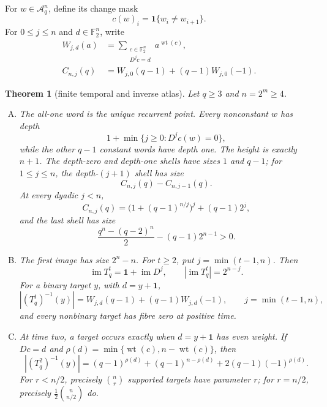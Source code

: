 \documentclass[a4paper,10pt]{amsart}
\newtheorem{theorem}{Theorem}
\theoremstyle{remark}
\newcommand{\F}{\mathbb F}
\newcommand{\one}{\boldsymbol 1}
\newcommand{\wt}{\operatorname{wt}}
\newcommand{\im}{\operatorname{im}}
\begin{document}
For $w\in\mathcal A_q^n$, define its change mask
\[
 c(w)_i=\mathbf 1\{w_i\ne w_{i+1}\}.
\]
For $0\leq j\leq n$ and $d\in\F_2^n$, write
\begin{align}
 W_{j,d}(a)&=\sum_{\substack{c\in\F_2^n\\D^jc=d}}a^{\wt(c)},
 \label{eq:affine-enum}\\
 C_{n,j}(q)&=W_{j,0}(q-1)+(q-1)W_{j,0}(-1).
 \label{eq:Cnj}
\end{align}

\begin{theorem}[finite temporal and inverse atlas]\label{thm:atlas}
Let $q\geq3$ and $n=2^m\geq4$.
\begin{enumerate}[(A)]
\item The all-one word is the unique recurrent point.  Every nonconstant
$w$ has depth
\begin{equation}\label{eq:depth}
 1+\min\{j\geq0:D^jc(w)=0\},
\end{equation}
while the other $q-1$ constant words have depth one.  The height is exactly
$n+1$.  The depth-zero and depth-one shells have sizes $1$ and $q-1$; for
$1\leq j\leq n$, the depth-$(j+1)$ shell has size
\begin{equation}\label{eq:shell}
 C_{n,j}(q)-C_{n,j-1}(q).
\end{equation}
At every dyadic $j<n$,
\begin{equation}\label{eq:checkpoint}
 C_{n,j}(q)=\bigl(1+(q-1)^{n/j}\bigr)^j+(q-1)2^j,
\end{equation}
and the last shell has size
\begin{equation}\label{eq:last}
 \frac{q^n-(q-2)^n}{2}-(q-1)2^{n-1}>0.
\end{equation}

\item The first image has size $2^n-n$.  For $t\geq2$, put
$j=\min(t-1,n)$.  Then
\begin{equation}\label{eq:image}
 \im T_q^t=\one+\im D^j,\qquad |\im T_q^t|=2^{n-j}.
\end{equation}
For a binary target $y$, with $d=y+\one$,
\begin{equation}\label{eq:fibre}
 |(T_q^t)^{-1}(y)|=W_{j,d}(q-1)+(q-1)W_{j,d}(-1),
 \qquad j=\min(t-1,n),
\end{equation}
and every nonbinary target has fibre zero at positive time.

\item At time two, a target occurs exactly when $d=y+\one$ has even
weight.  If $Dc=d$ and
$\rho(d)=\min\{\wt(c),n-\wt(c)\}$, then
\begin{equation}\label{eq:t2}
 |(T_q^2)^{-1}(y)|=(q-1)^{\rho(d)}+(q-1)^{n-\rho(d)}
       +2(q-1)(-1)^{\rho(d)}.
\end{equation}
For $r<n/2$, precisely $\binom nr$ supported targets have parameter $r$;
for $r=n/2$, precisely $\frac12\binom n{n/2}$ do.


\end{enumerate}
\end{theorem}
\end{document}
